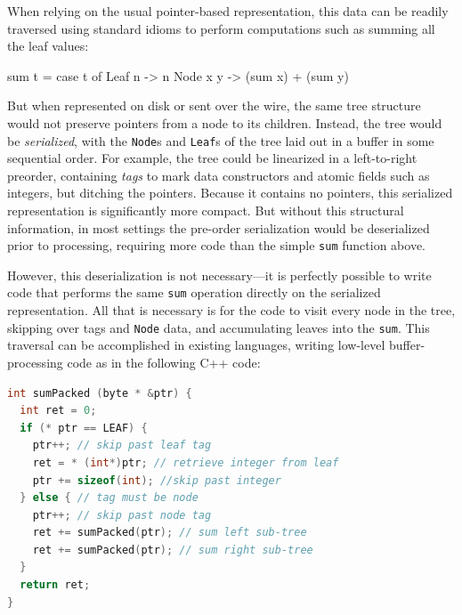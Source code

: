 \documentclass[showabstract,showacknowledgments,showpreface,showdedication]{iuphd}
\theoremstyle{nonumberplain}
\newcommand{\il}[1]{\lstinline[style=inline,mathescape=true];#1;}
\begin{document}
When relying on the usual pointer-based representation, this data 
can be readily traversed using standard idioms to perform computations such as summing all the leaf values:
\begin{code}
sum t = case t of
          Leaf n   -> n
          Node x y -> (sum x) + (sum y)
\end{code}

But when represented on disk or sent over the wire, the same tree structure
would not preserve pointers from a node to its children. Instead, the tree
would be {\em serialized}, with the \il{Node}s and \il{Leaf}s of the tree laid
out in a buffer in some sequential order. For example, the tree could be
linearized in a left-to-right preorder, containing {\em tags} to mark data
constructors and atomic fields such as integers, but ditching the pointers.
Because it contains no pointers, this serialized representation is
significantly more compact.
%
But without this structural information, in most settings the
pre-order serialization would be deserialized prior to processing,
requiring more code than the simple \il{sum} function above.

However, this deserialization
is not necessary---it is perfectly possible to write code that performs
the same \il{sum} operation directly on the serialized representation.
All that is necessary is for the code to visit every node in the tree, skipping over
tags and \il{Node} data, and accumulating leaves into the \il{sum}.
%
This traversal can be accomplished in existing languages, writing low-level
buffer-processing code as in the following C++ code:


\begin{lstlisting}[language=C++]
int sumPacked (byte * &ptr) {
  int ret = 0; 
  if (* ptr == LEAF) {
    ptr++; // skip past leaf tag
    ret = * (int*)ptr; // retrieve integer from leaf
    ptr += sizeof(int); //skip past integer
  } else { // tag must be node
    ptr++; // skip past node tag
    ret += sumPacked(ptr); // sum left sub-tree
    ret += sumPacked(ptr); // sum right sub-tree
  }
  return ret;
}
\end{lstlisting}
\end{document}
